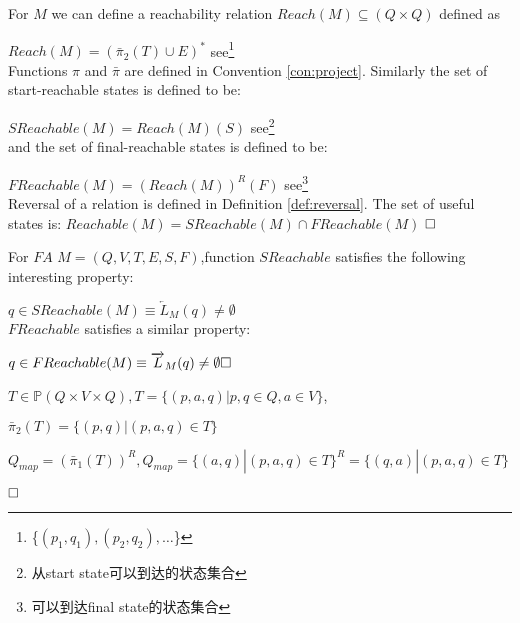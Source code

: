 \begin{definition}
	For $M$ we can define a reachability relation $Reach(M)\subseteq (Q\times Q)$ defined as
	
	$Reach(M) = (\bar{\pi}_2(T)\cup E)^\ast$        see\footnote{\{$(p_1,q_1),(p_2,q_2),\dots$\}}\\
	Functions $\pi$ and $\bar{\pi}$ are defined in Convention \ref{con:project}. Similarly the set of start-reachable states is defined to be:
	
	$SReachable(M)=Reach(M)(S)$ see\footnote{从start state可以到达的状态集合}\\
	and the set of final-reachable states is defined to be:
	
	$FReachable(M)=(Reach(M))^R(F)$ see\footnote{可以到达final state的状态集合}\\
	Reversal of a relation is defined in Definition \ref{def:reversal}. The set of useful states is:
	$Reachable(M)=SReachable(M)\cap FReachable(M)$ $\hfill\square$
\end{definition}

\begin{remark} For $FA$ $M=(Q,V,T,E,S,F)$,function $SReachable$ satisfies the following interesting property:
	
	$q\in SReachable(M)\equiv\overleftarrow{L}_M(q)\ne\emptyset$\\
	$FReachable$ satisfies a similar property:
	
	$q\in FReachable(M)\equiv\overrightarrow{L}_M(q)\ne\emptyset\hfill\square$
\end{remark}

\begin{example}
	$T\in \mathbb{P}(Q\times V\times Q), T = \{(p,a,q)|p,q\in Q,a\in V\}$,
	
	$\bar{\pi}_2(T) = \{(p,q)|(p,a,q)\in T \}$	
	
	$Q_{map} = (\bar{\pi}_1(T))^R, Q_{map} = \{(a,q)|(p,a,q) \in T\}^R = \{(q,a)|(p,a,q) \in T\}$
	
	
	$\hfill\square$
\end{example}



